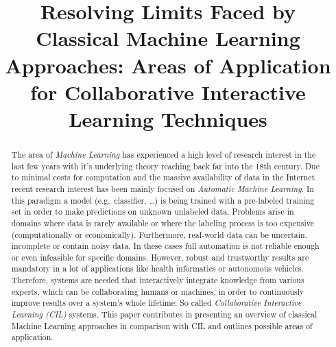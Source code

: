 \documentclass[conference]{IEEEtran}
\begin{document}
\title{Resolving Limits Faced by Classical Machine Learning Approaches: Areas of Application for 
Collaborative Interactive Learning Techniques}


\author{
}

\maketitle

\begin{abstract}
The area of \textit{Machine Learning} has experienced a high 
level of research interest in the last few years with it's underlying 
theory reaching back far into the 18th century. Due to minimal 
costs for computation and the massive availability of data in the 
Internet recent research interest has been mainly focused on 
\textit{Automatic Machine Learning}. In this paradigm a model 
(e.g.\ classifier, \dots) is being trained with a pre-labeled training 
set in order to make predictions on unknown unlabeled data. Problems arise 
in domains where data is rarely available or where the labeling process is 
too expensive (computationally or economically). Furthermore, real-world data 
can be uncertain, incomplete or contain noisy data. In these cases 
full automation is not reliable enough or even infeasible for specific 
domains. However, robust and trustworthy results are mandatory in a lot of 
applications like health informatics or autonomous vehicles. 
Therefore, systems are needed that interactively integrate knowledge from 
various experts, which can be collaborating humans or machines, in order 
to continuously improve results over a system's whole lifetime: So called 
\textit{Collaborative Interactive Learning (CIL)} systems.
This paper contributes in presenting an overview of classical Machine Learning 
approaches in comparison with CIL and outlines possible areas of application. 
\end{abstract}
\end{document}
